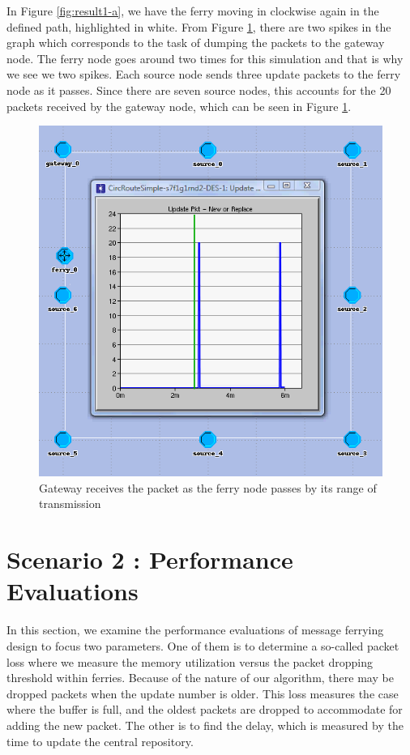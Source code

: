 In Figure \ref{fig:result1-a}, we have the ferry moving in clockwise again in the defined path, highlighted in white.  
From Figure \ref{fig:result1-b}, there are two spikes in the graph which corresponds to the task of dumping the packets to the gateway node.  
The ferry node goes around two times for this simulation and that is why we see we two spikes.  
Each source node sends three update packets to the ferry node as it passes.  
Since there are seven source nodes, this accounts for the 20 packets received by the gateway node, which can be seen in Figure \ref{fig:result1-b}.


\begin{figure}[h]
    \centering
    \includegraphics[width=.5\textwidth]{images/scenario1-result-gateway}
    \caption{Gateway receives the packet as the ferry node passes by its range of transmission}
    \label{fig:result1-b}
\end{figure}




\section{Scenario 2 : Performance Evaluations}
\label{sec:scenario2}


In this section, we examine the performance evaluations of message ferrying design to focus two parameters.  
One of them is to determine a so-called packet loss where we measure the memory utilization versus the packet dropping threshold within ferries.
Because of the nature of our algorithm, there may be dropped packets when the update number is older.
This loss measures the case where the buffer is full, and the oldest packets are dropped to accommodate for adding the new packet.  
The other is to find the delay, which is measured by the time to update the central repository.


